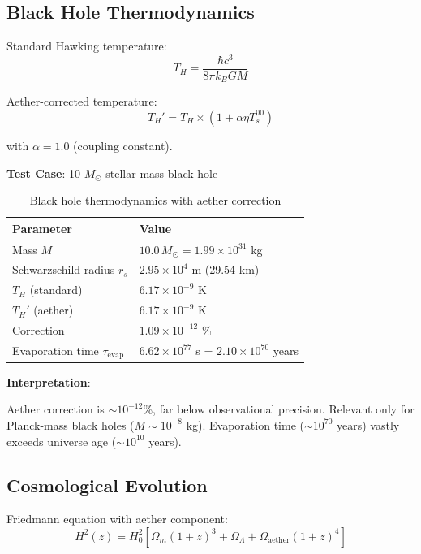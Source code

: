 \documentclass[12pt,a4paper]{article}
\begin{document}
\subsection{Black Hole Thermodynamics}

Standard Hawking temperature:
\begin{equation}
T_H = \frac{\hbar c^3}{8\pi k_B G M}
\label{eq:hawking_temp}
\end{equation}

Aether-corrected temperature:
\begin{equation}
T_H' = T_H \times \left(1 + \alpha \eta T_s^{00}\right)
\label{eq:hawking_corrected}
\end{equation}

with $\alpha = 1.0$ (coupling constant).

\textbf{Test Case}: 10 $M_\odot$ stellar-mass black hole

\begin{table}[H]
\centering
\begin{tabular}{@{}ll@{}}
\toprule
\textbf{Parameter} & \textbf{Value} \\
\midrule
Mass $M$ & $10.0 \, M_\odot = 1.99 \times 10^{31}$ kg \\
Schwarzschild radius $r_s$ & $2.95 \times 10^4$ m (29.54 km) \\
$T_H$ (standard) & $6.17 \times 10^{-9}$ K \\
$T_H'$ (aether) & $6.17 \times 10^{-9}$ K \\
Correction & $1.09 \times 10^{-12}$ \% \\
Evaporation time $\tau_{\text{evap}}$ & $6.62 \times 10^{77}$ s = $2.10 \times 10^{70}$ years \\
\bottomrule
\end{tabular}
\caption{Black hole thermodynamics with aether correction}
\label{tab:black_hole}
\end{table}

\textbf{Interpretation}:

Aether correction is $\sim 10^{-12}$\%, far below observational precision. Relevant only for Planck-mass black holes ($M \sim 10^{-8}$ kg). Evaporation time ($\sim 10^{70}$ years) vastly exceeds universe age ($\sim 10^{10}$ years).

\subsection{Cosmological Evolution}

Friedmann equation with aether component:
\begin{equation}
H^2(z) = H_0^2 \left[\Omega_m (1+z)^3 + \Omega_\Lambda + \Omega_{\text{aether}} (1+z)^4\right]
\label{eq:friedmann_aether}
\end{equation}
\end{document}
